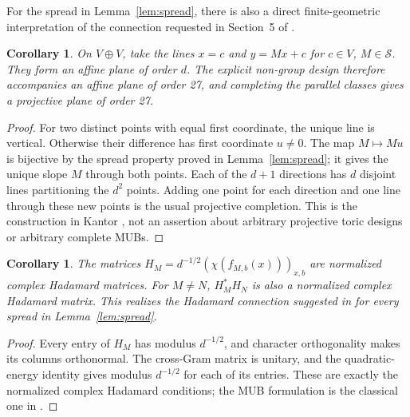 \documentclass[11pt]{article}
\newtheorem{corollary}[theorem]{Corollary}
\newcommand{\Sset}{\mathcal S}
\begin{document}
For the spread in Lemma~\ref{lem:spread}, there is also a direct finite-geometric interpretation of the connection requested in Section~5 of \cite{iosue}.
\begin{corollary}\label{cor:planes}
On $V\oplus V$, take the lines $x=c$ and $y=Mx+c$ for $c\in V$, $M\in\Sset$. They form an affine plane of order $d$. The explicit non-group design therefore accompanies an affine plane of order 27, and completing the parallel classes gives a projective plane of order 27.
\end{corollary}
\begin{proof}
For two distinct points with equal first coordinate, the unique line is vertical. Otherwise their difference has first coordinate $u\ne0$. The map $M\mapsto Mu$ is bijective by the spread property proved in Lemma~\ref{lem:spread}; it gives the unique slope $M$ through both points. Each of the $d+1$ directions has $d$ disjoint lines partitioning the $d^2$ points. Adding one point for each direction and one line through these new points is the usual projective completion. This is the construction in Kantor \cite[Eq.~(3.3)]{kantor}, not an assertion about arbitrary projective toric designs or arbitrary complete MUBs.
\end{proof}

\begin{corollary}\label{cor:hadamard}
The matrices $H_M=d^{-1/2}(\chi(f_{M,b}(x)))_{x,b}$ are normalized complex Hadamard matrices. For $M\ne N$, $H_M^*H_N$ is also a normalized complex Hadamard matrix. This realizes the Hadamard connection suggested in \cite[Section~5, p.~16]{iosue} for every spread in Lemma~\ref{lem:spread}.
\end{corollary}
\begin{proof}
Every entry of $H_M$ has modulus $d^{-1/2}$, and character orthogonality makes its columns orthonormal. The cross-Gram matrix is unitary, and the quadratic-energy identity gives modulus $d^{-1/2}$ for each of its entries. These are exactly the normalized complex Hadamard conditions; the MUB formulation is the classical one in \cite[Section~3]{kantor}.
\end{proof}
\end{document}
